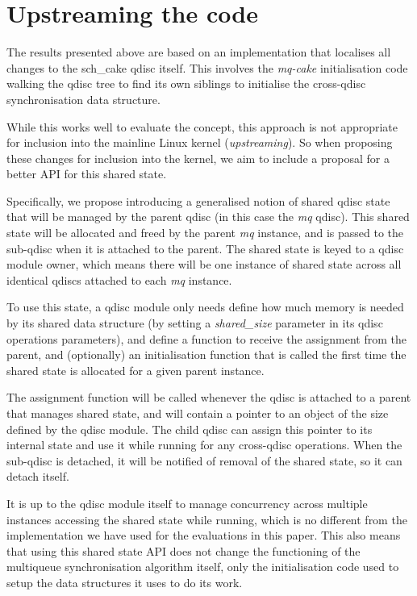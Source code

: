 \section{Upstreaming the code}\label{sec:upstreaming}
The results presented above are based on an implementation that localises all
changes to the sch\_cake qdisc itself. This involves the \textit{mq-cake}
initialisation code walking the qdisc tree to find its own siblings to
initialise the cross-qdisc synchronisation data structure.

While this works well to evaluate the concept, this approach is not appropriate
for inclusion into the mainline Linux kernel (\textit{upstreaming}). So when
proposing these changes for inclusion into the kernel, we aim to include a
proposal for a better API for this shared state.

Specifically, we propose introducing a generalised notion of shared qdisc state
that will be managed by the parent qdisc (in this case the \textit{mq} qdisc).
This shared state will be allocated and freed by the parent \textit{mq}
instance, and is passed to the sub-qdisc when it is attached to the parent. The
shared state is keyed to a qdisc module owner, which means there will be one
instance of shared state across all identical qdiscs attached to each
\textit{mq} instance.

To use this state, a qdisc module only needs define how much memory is needed by
its shared data structure (by setting a \textit{shared\_size} parameter in its
qdisc operations parameters), and define a function to receive the assignment
from the parent, and (optionally) an initialisation function that is called the
first time the shared state is allocated for a given parent instance.

The assignment function will be called whenever the qdisc is attached to a
parent that manages shared state, and will contain a pointer to an object of the
size defined by the qdisc module. The child qdisc can assign this pointer to its
internal state and use it while running for any cross-qdisc operations. When the
sub-qdisc is detached, it will be notified of removal of the shared state, so it
can detach itself.

It is up to the qdisc module itself to manage concurrency across multiple
instances accessing the shared state while running, which is no different from
the implementation we have used for the evaluations in this paper. This also
means that using this shared state API does not change the functioning of the
multiqueue synchronisation algorithm itself, only the initialisation code used
to setup the data structures it uses to do its work.
